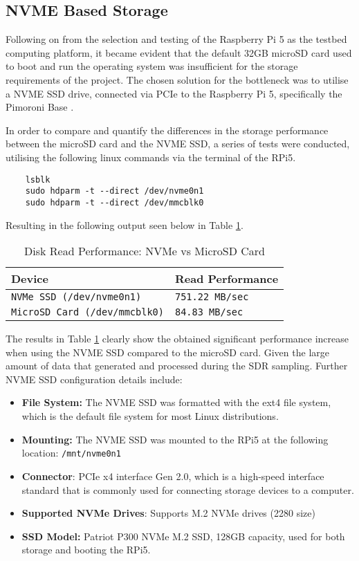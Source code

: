 \subsection{NVME Based Storage \label{sec:storage}}
Following on from the selection and testing of the Raspberry Pi 5 as the testbed computing platform, it became evident that the default 32GB microSD card used to boot and run the operating system was insufficient for the storage requirements of the project. The chosen solution for the bottleneck was to utilise a NVME SSD drive, connected via PCIe to the Raspberry Pi 5, specifically the Pimoroni Base \cite{pimoroni_nvme_base}.

In order to compare and quantify the differences in the storage performance between the microSD card and the NVME SSD, a series of tests were conducted, utilising the following linux commands via the terminal of the RPi5.

\begin{verbatim}
    lsblk
    sudo hdparm -t --direct /dev/nvme0n1 
    sudo hdparm -t --direct /dev/mmcblk0
\end{verbatim}

\noindent Resulting in the following output seen below in Table \ref{tab:diskperf}.

\begin{table}[h!]
    \centering
    \caption{Disk Read Performance: NVMe vs MicroSD Card \label{tab:diskperf}}
    \begin{tabular}{|l|l|}
    \hline
    \textbf{Device} & \textbf{Read Performance} \\ \hline
    \texttt{NVMe SSD (\texttt{/dev/nvme0n1})} & \texttt{751.22 MB/sec} \\ \hline
    \texttt{MicroSD Card (\texttt{/dev/mmcblk0})} & \texttt{84.83 MB/sec} \\ \hline
    \end{tabular}
\end{table}

The results in Table \ref{tab:diskperf} clearly show the obtained significant performance increase when using the NVME SSD compared to the microSD card. Given the large amount of data that generated and processed during the SDR sampling. Further NVME SSD configuration details include: 

\begin{itemize}
    \item \textbf{File System:} The NVME SSD was formatted with the ext4 file system, which is the default file system for most Linux distributions. 
    \item \textbf{Mounting:} The NVME SSD was mounted to the RPi5 at the following location: \texttt{/mnt/nvme0n1}
    \item \textbf{Connector}: PCIe x4 interface Gen 2.0, which is a high-speed interface standard that is commonly used for connecting storage devices to a computer.
    \item \textbf{Supported NVMe Drives}: Supports M.2 NVMe drives (2280 size)
    \item \textbf{SSD Model:} Patriot P300 NVMe M.2 SSD, 128GB capacity, used for both storage and booting the RPi5.
\end{itemize}


